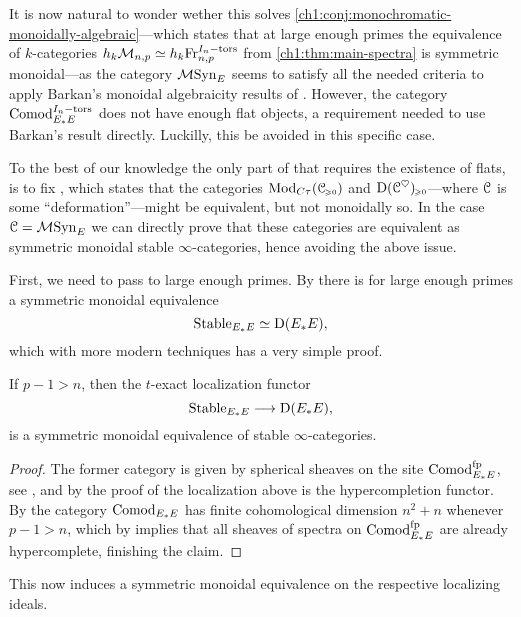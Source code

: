It is now natural to wonder wether this solves \cref{ch1:conj:monochromatic-monoidally-algebraic}---which states that at large enough primes the equivalence of $k$-categories $h_k\mathcal{M}_{n,p} \simeq h_k\mathrm{Fr}_{n,p}^{I_n-\mathrm{tors}}$ from \cref{ch1:thm:main-spectra} is symmetric monoidal---as the category $\mathcal{M}\mathrm{Syn}_{E}$ seems to satisfy all the needed criteria to apply Barkan's monoidal algebraicity results of \cite{barkan_2023}. However, the category $\mathrm{Comod}_{E_*E}^{I_n-\mathrm{tors}}$ does not have enough flat objects, a requirement needed to use Barkan's result directly. Luckilly, this be avoided in this specific case. 

To the best of our knowledge the only part of \cite[Theorem H]{barkan_2023} that requires the existence of flats, is to fix \cite[Warning 3..30]{barkan_2023}, which states that the categories $\mathrm{Mod}_{C\tau}(\EuScript{C}_{\hspace{-1pt}\scriptscriptstyle\geqslant 0})$ and $\mathrm{D}(\EuScript{C}^\heartsuit)_{\hspace{-1pt}\scriptscriptstyle\geqslant 0}$---where $\EuScript{C}$ is some ``deformation''---might be equivalent, but not monoidally so. In the case $\EuScript{C}= \mathcal{M}\mathrm{Syn}_{E}$ we can directly prove that these categories are equivalent as symmetric monoidal stable $\infty$-categories, hence avoiding the above issue. 

First, we need to pass to large enough primes. By \cite[4.11]{barthel-heard_2018} there is for large enough primes a symmetric monoidal equivalence
\[\mathrm{Stable}_{E_*E} \simeq \mathrm{D}(E_*E),\]
which with more modern techniques has a very simple proof. 

\begin{lemma}
    \label{ch3:add:cor:hypercomplete-at-large-primes}
    If $p-1>n$, then the $t$-exact localization functor
    \[\mathrm{Stable}_{E_*E} \longrightarrow \mathrm{D}(E_*E),\]
    is a symmetric monoidal equivalence of stable $\infty$-categories.  
\end{lemma}
\begin{proof}
    The former category is given by spherical sheaves on the site $\mathrm{Comod}_{E_*E}^{\mathrm{fp}}$, see \cite[3.7]{pstragowski_2022}, and by the proof of \cite[4.54]{pstragowski_2022} the localization above is the hypercompletion functor. By \cite[2.5]{pstragowski_2021} the category $\mathrm{Comod}_{E_*E}$ has finite cohomological dimension $n^2+n$ whenever $p-1>n$, which by \cite[2.10]{clausen-mathew_2021} implies that all sheaves of spectra on $\mathrm{Comod}_{E_*E}^{\mathrm{fp}}$ are already hypercomplete, finishing the claim. 
\end{proof}

This now induces a symmetric monoidal equivalence on the respective localizing ideals. 

